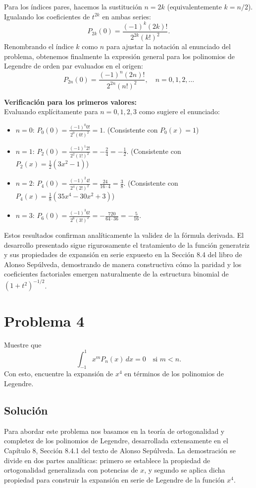 \documentclass[a4paper]{article}
\begin{document}
Para los índices pares, hacemos la sustitución $n = 2k$ (equivalentemente $k = n/2$). Igualando los coeficientes de $t^{2k}$ en ambas series:
$$
P_{2k}(0) = \frac{(-1)^k (2k)!}{2^{2k} (k!)^2}.
$$
Renombrando el índice $k$ como $n$ para ajustar la notación al enunciado del problema, obtenemos finalmente la expresión general para los polinomios de Legendre de orden par evaluados en el origen:
$$
P_{2n}(0) = \frac{(-1)^n (2n)!}{2^{2n} (n!)^2}, \quad n = 0, 1, 2, \dots
$$

\vspace{0.3cm}
\noindent\textbf{Verificación para los primeros valores:}\\
Evaluando explícitamente para $n=0,1,2,3$ como sugiere el enunciado:
\begin{itemize}
    \item $n=0$: $P_0(0) = \frac{(-1)^0 0!}{2^0 (0!)^2} = 1$. (Consistente con $P_0(x)=1$)
    \item $n=1$: $P_2(0) = \frac{(-1)^1 2!}{2^2 (1!)^2} = -\frac{2}{4} = -\frac{1}{2}$. (Consistente con $P_2(x)=\frac{1}{2}(3x^2-1)$)
    \item $n=2$: $P_4(0) = \frac{(-1)^2 4!}{2^4 (2!)^2} = \frac{24}{16 \cdot 4} = \frac{3}{8}$. (Consistente con $P_4(x)=\frac{1}{8}(35x^4-30x^2+3)$)
    \item $n=3$: $P_6(0) = \frac{(-1)^3 6!}{2^6 (3!)^2} = -\frac{720}{64 \cdot 36} = -\frac{5}{16}$.
\end{itemize}
Estos resultados confirman analíticamente la validez de la fórmula derivada. El desarrollo presentado sigue rigurosamente el tratamiento de la función generatriz y sus propiedades de expansión en serie expuesto en la Sección 8.4 del libro de Alonso Sepúlveda, demostrando de manera constructiva cómo la paridad y los coeficientes factoriales emergen naturalmente de la estructura binomial de $(1+t^2)^{-1/2}$.


\section{Problema 4}
Muestre que
$$
\int_{-1}^{1} x^m P_n(x) \, dx = 0 \quad \text{si } m < n.
$$
Con esto, encuentre la expansión de $x^4$ en términos de los polinomios de Legendre.

\subsection{Solución}
Para abordar este problema nos basamos en la teoría de ortogonalidad y completez de los polinomios de Legendre, desarrollada extensamente en el Capítulo 8, Sección 8.4.1 del texto de Alonso Sepúlveda. La demostración se divide en dos partes analíticas: primero se establece la propiedad de ortogonalidad generalizada con potencias de $x$, y segundo se aplica dicha propiedad para construir la expansión en serie de Legendre de la función $x^4$.
\end{document}
